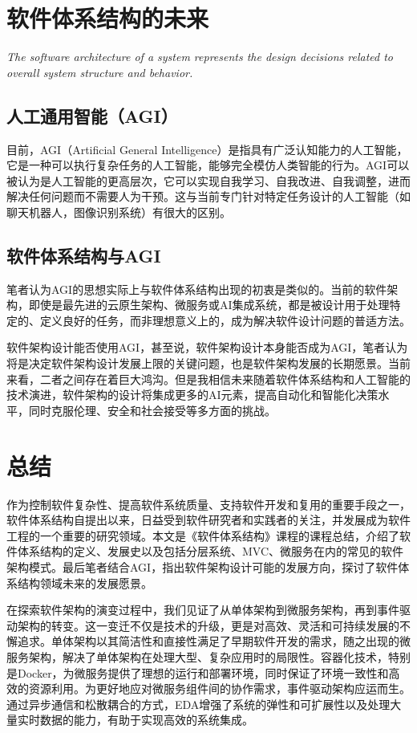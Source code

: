 \documentclass{SCIS2023cn}
\begin{document}
\section{软件体系结构的未来}

\textit{The software architecture of a system represents the design decisions related to overall system structure and behavior.}

\subsection{人工通用智能（AGI）}

目前，AGI（Artificial General Intelligence）是指具有广泛认知能力的人工智能，它是一种可以执行复杂任务的人工智能，能够完全模仿人类智能的行为。AGI可以被认为是人工智能的更高层次，它可以实现自我学习、自我改进、自我调整，进而解决任何问题而不需要人为干预。这与当前专门针对特定任务设计的人工智能（如聊天机器人，图像识别系统）有很大的区别。

\subsection{软件体系结构与AGI}

笔者认为AGI的思想实际上与软件体系结构出现的初衷是类似的。当前的软件架构，即使是最先进的云原生架构、微服务或AI集成系统，都是被设计用于处理特定的、定义良好的任务，而非理想意义上的，成为解决软件设计问题的普适方法。

软件架构设计能否使用AGI，甚至说，软件架构设计本身能否成为AGI，笔者认为将是决定软件架构设计发展上限的关键问题，也是软件架构发展的长期愿景。当前来看，二者之间存在着巨大鸿沟。但是我相信未来随着软件体系结构和人工智能的技术演进，软件架构的设计将集成更多的AI元素，提高自动化和智能化决策水平，同时克服伦理、安全和社会接受等多方面的挑战。

\section{总结}

作为控制软件复杂性、提高软件系统质量、支持软件开发和复用的重要手段之一，软件体系结构自提出以来，日益受到软件研究者和实践者的关注，并发展成为软件工程的一个重要的研究领域。本文是《软件体系结构》课程的课程总结，介绍了软件体系结构的定义、发展史以及包括分层系统、MVC、微服务在内的常见的软件架构模式。最后笔者结合AGI，指出软件架构设计可能的发展方向，探讨了软件体系结构领域未来的发展愿景。

在探索软件架构的演变过程中，我们见证了从单体架构到微服务架构，再到事件驱动架构的转变。这一变迁不仅是技术的升级，更是对高效、灵活和可持续发展的不懈追求。单体架构以其简洁性和直接性满足了早期软件开发的需求，随之出现的微服务架构，解决了单体架构在处理大型、复杂应用时的局限性。容器化技术，特别是Docker，为微服务提供了理想的运行和部署环境，同时保证了环境一致性和高效的资源利用。为更好地应对微服务组件间的协作需求，事件驱动架构应运而生。通过异步通信和松散耦合的方式，EDA增强了系统的弹性和可扩展性以及处理大量实时数据的能力，有助于实现高效的系统集成。
\end{document}
